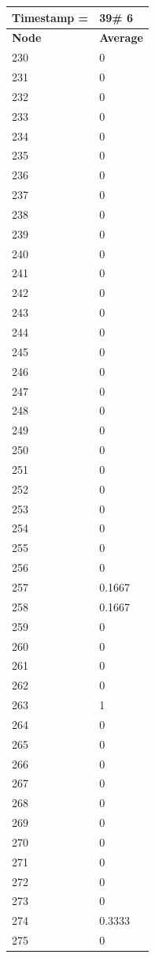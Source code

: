 \begin{tabular}{|l||l|}
\hline
\textbf{Timestamp =} & \textbf{39}\# 6\\\hline
	\textbf{Node} & \textbf{Average} \\ \hline
\hline
	230 & 0 \\ \hline
	231 & 0 \\ \hline
	232 & 0 \\ \hline
	233 & 0 \\ \hline
	234 & 0 \\ \hline
	235 & 0 \\ \hline
	236 & 0 \\ \hline
	237 & 0 \\ \hline
	238 & 0 \\ \hline
	239 & 0 \\ \hline
	240 & 0 \\ \hline
	241 & 0 \\ \hline
	242 & 0 \\ \hline
	243 & 0 \\ \hline
	244 & 0 \\ \hline
	245 & 0 \\ \hline
	246 & 0 \\ \hline
	247 & 0 \\ \hline
	248 & 0 \\ \hline
	249 & 0 \\ \hline
	250 & 0 \\ \hline
	251 & 0 \\ \hline
	252 & 0 \\ \hline
	253 & 0 \\ \hline
	254 & 0 \\ \hline
	255 & 0 \\ \hline
	256 & 0 \\ \hline
	257 & 0.1667 \\ \hline
	258 & 0.1667 \\ \hline
	259 & 0 \\ \hline
	260 & 0 \\ \hline
	261 & 0 \\ \hline
	262 & 0 \\ \hline
	263 & 1 \\ \hline
	264 & 0 \\ \hline
	265 & 0 \\ \hline
	266 & 0 \\ \hline
	267 & 0 \\ \hline
	268 & 0 \\ \hline
	269 & 0 \\ \hline
	270 & 0 \\ \hline
	271 & 0 \\ \hline
	272 & 0 \\ \hline
	273 & 0 \\ \hline
	274 & 0.3333 \\ \hline
	275 & 0 \\ \hline
\end{tabular}

